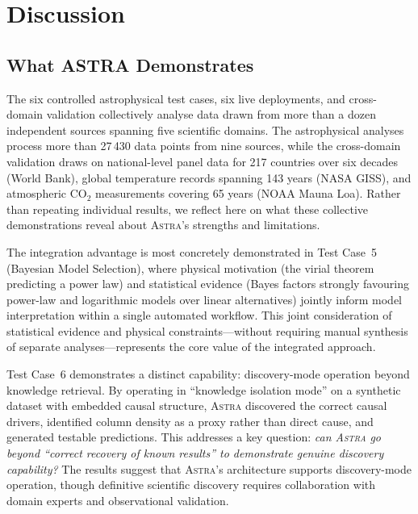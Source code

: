 \documentclass[usenatbib]{rasti}
\newcommand{\astra}{\textsc{Astra}\xspace}
\begin{document}
\section{Discussion}
\label{sec:discussion}

\subsection{What ASTRA Demonstrates}
\label{sec:discussion:demonstrates}

The six controlled astrophysical test cases, six live deployments, and cross-domain validation collectively analyse data drawn from more than a dozen independent sources spanning five scientific domains.
The astrophysical analyses process more than 27\,430 data points from nine sources, while the cross-domain validation draws on national-level panel data for 217 countries over six decades (World Bank), global temperature records spanning 143 years (NASA GISS), and atmospheric CO$_{2}$ measurements covering 65 years (NOAA Mauna Loa).
Rather than repeating individual results, we reflect here on what these collective demonstrations reveal about \astra's strengths and limitations.

The integration advantage is most concretely demonstrated in Test Case~5 (Bayesian Model Selection), where physical motivation (the virial theorem predicting a power law) and statistical evidence (Bayes factors strongly favouring power-law and logarithmic models over linear alternatives) jointly inform model interpretation within a single automated workflow.
This joint consideration of statistical evidence and physical constraints---without requiring manual synthesis of separate analyses---represents the core value of the integrated approach.

Test Case~6 demonstrates a distinct capability: discovery-mode operation beyond knowledge retrieval.
By operating in ``knowledge isolation mode'' on a synthetic dataset with embedded causal structure, \astra discovered the correct causal drivers, identified column density as a proxy rather than direct cause, and generated testable predictions.
This addresses a key question: \emph{can \astra go beyond ``correct recovery of known results'' to demonstrate genuine discovery capability?}
The results suggest that \astra's architecture supports discovery-mode operation, though definitive scientific discovery requires collaboration with domain experts and observational validation.
\end{document}

